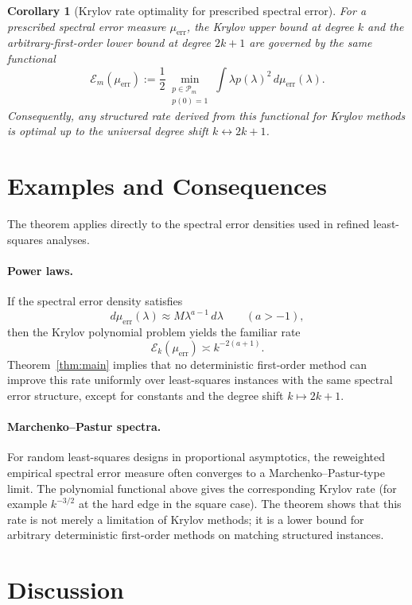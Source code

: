 \documentclass[11pt]{article}
\newtheorem{corollary}[theorem]{Corollary}
\theoremstyle{definition}
\newcommand{\Pcal}{\mathcal{P}}
\begin{document}
\begin{corollary}[Krylov rate optimality for prescribed spectral error]
For a prescribed spectral error measure \(\mu_{\mathrm{err}}\), the Krylov
upper bound at degree \(k\) and the arbitrary-first-order lower bound at
degree \(2k+1\) are governed by the same functional
\[
  \mathcal E_m(\mu_{\mathrm{err}})
  :=
  \frac12
  \min_{\substack{p\in\Pcal_m\\p(0)=1}}
  \int \lambda p(\lambda)^2\,d\mu_{\mathrm{err}}(\lambda).
\]
Consequently, any structured rate derived from this functional for Krylov
methods is optimal up to the universal degree shift \(k\leftrightarrow 2k+1\).
\end{corollary}

\section{Examples and Consequences}

The theorem applies directly to the spectral error densities used in refined
least-squares analyses.

\paragraph{Power laws.}
If the spectral error density satisfies
\[
  d\mu_{\mathrm{err}}(\lambda)\approx M\lambda^{a-1}\,d\lambda
  \qquad (a>-1),
\]
then the Krylov polynomial problem yields the familiar rate
\[
  \mathcal E_k(\mu_{\mathrm{err}})
  \asymp k^{-2(a+1)}.
\]
Theorem~\ref{thm:main} implies that no deterministic first-order method can improve
this rate uniformly over least-squares instances with the same spectral error
structure, except for constants and the degree shift \(k\mapsto 2k+1\).

\paragraph{Marchenko--Pastur spectra.}
For random least-squares designs in proportional asymptotics, the reweighted
empirical spectral error measure often converges to a Marchenko--Pastur-type
limit.  The polynomial functional above gives the corresponding Krylov rate
(for example \(k^{-3/2}\) at the hard edge in the square case).  The theorem
shows that this rate is not merely a limitation of Krylov methods; it is a
lower bound for arbitrary deterministic first-order methods on matching
structured instances.

\section{Discussion}
\end{document}
